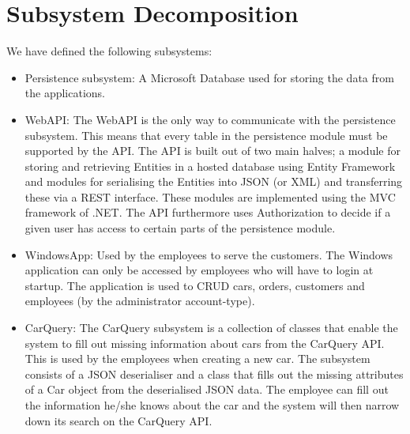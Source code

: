 \section{Subsystem Decomposition}
We have defined the following subsystems:
\begin{itemize}
	\item Persistence subsystem: A Microsoft Database used for storing the data from the applications.
	\item WebAPI: The WebAPI is the only way to communicate with the persistence subsystem. This means that every table in the persistence module must be supported by the API. 
	The API is built out of two main halves; a module for storing and retrieving Entities in a hosted database using Entity Framework and modules for serialising the Entities into JSON (or XML) and transferring these via a REST interface. These modules are implemented using the MVC framework of .NET. 
	The API furthermore uses Authorization to decide if a given user has access to certain parts of the persistence module.
	\item WindowsApp: Used by the employees to serve the customers. The Windows application can only be accessed by employees who will have to login at startup. The application is used to CRUD cars, orders, customers and employees (by the administrator account-type).
	\item CarQuery: The CarQuery subsystem is a collection of classes that enable the system to fill out missing information about cars from the CarQuery API. \\
	This is used by the employees when creating a new car. The subsystem consists of a JSON deserialiser and a class that fills out the missing attributes of a Car object from the deserialised JSON data. 
	The employee can fill out the information he/she knows about the car and the system will then narrow down its search on the CarQuery API. 
\end{itemize}